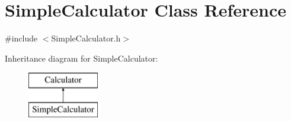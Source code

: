 \hypertarget{class_simple_calculator}{}\section{Simple\+Calculator Class Reference}
\label{class_simple_calculator}


{\ttfamily \#include $<$Simple\+Calculator.\+h$>$}

Inheritance diagram for Simple\+Calculator\+:\begin{figure}[H]
\begin{center}
\leavevmode
\includegraphics[height=2.000000cm]{class_simple_calculator}
\end{center}
\end{figure}
